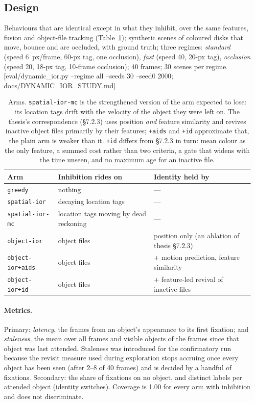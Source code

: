 \documentclass[11pt,a4paper]{article}
\newcommand{\src}[1]{\textcolor{blue!50!black}{\footnotesize\,[#1]}}
\newcommand{\src}[1]{}
\newcommand{\arm}[1]{\texttt{#1}}
\begin{document}
\subsection{Design}
Behaviours that are identical except in what they inhibit, over the same
features, fusion and object-file tracking (Table~\ref{tab:arms}); synthetic scenes
of coloured disks that move, bounce and are occluded, with ground truth; three
regimes: \emph{standard} (speed 6~px/frame, 60-px tag, one occlusion),
\emph{fast} (speed 40, 20-px tag), \emph{occlusion} (speed 20, 18-px tag,
10-frame occlusion); 40 frames; 30 scenes per regime.
\src{eval/dynamic\_ior.py --regime all --seeds 30 --seed0 2000; docs/DYNAMIC\_IOR\_STUDY.md}

\begin{table}[t]
\caption{Arms. \arm{spatial-ior-mc} is the strengthened version of the arm
expected to lose: its location tags drift with the velocity of the object they
were left on. The thesis's correspondence (\S7.2.3) uses position \emph{and}
feature similarity and revives inactive object files primarily by their
features; \arm{+aids} and \arm{+id} approximate that, the plain arm is weaker
than it. \arm{+id} differs from \S7.2.3 in turn: mean colour as the only
feature, a summed cost rather than two criteria, a gate that widens with the
time unseen, and no maximum age for an inactive file.}
\label{tab:arms}
\small
\begin{tabularx}{\linewidth}{@{}lXX@{}}
\toprule
Arm & Inhibition rides on & Identity held by \\
\midrule
\arm{greedy} & nothing & --- \\
\arm{spatial-ior} & decaying location tags & --- \\
\arm{spatial-ior-mc} & location tags moving by dead reckoning & --- \\
\arm{object-ior} & object files & position only (an ablation of thesis \S7.2.3) \\
\arm{object-ior+aids} & object files & + motion prediction, feature similarity \\
\arm{object-ior+id} & object files & + feature-led revival of inactive files \\
\bottomrule
\end{tabularx}
\end{table}

\paragraph{Metrics.} Primary: \emph{latency}, the frames from an object's
appearance to its first fixation; and \emph{staleness}, the mean over all frames
and visible objects of the frames since that object was last attended. Staleness
was introduced for the confirmatory run because the revisit measure used during
exploration stops accruing once every object has been seen (after 2--8 of 40
frames) and is decided by a handful of fixations. Secondary: the share of
fixations on no object, and distinct labels per attended object (identity
switches). Coverage is 1.00 for every arm with inhibition and does not
discriminate.
\end{document}
